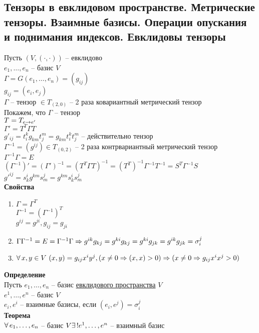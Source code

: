 \documentclass[12pt]{article}
\begin{document}
\subsection{Тензоры в евклидовом пространстве. Метрические тензоры. Взаимные базисы. Операции опускания и поднимания индексов. Евклидовы тензоры}
Пусть $(V, (\cdot, \cdot))$ -- евклидово\\
$e_1, \ldots, e_n$ -- базис $V$\\
$\Gamma = G(e_1, \ldots, e_n) = (g_{ij})$\\
$g_{ij} = (e_i, e_j)$\\
$\Gamma$ -- тензор $\in T_{(2,0)}$ -- 2 раза ковариантный метрический тензор\\
Покажем, что $\Gamma$ -- тензор\\
$T = T_{e\rightarrow e'}$\\
$\Gamma' = T^T \Gamma T$\\
$g'_{ij} = t^k_i g_{km} t^m_j = g_{km} t^k_i t^m_j$ -- действительно тензор\\
$\Gamma^{-1} = (g^{ij}) \in T_{(0,2)}$ -- 2 раза контрвариантный метрический тензор\\
$\Gamma^{-1} \Gamma = E$\\
$(\Gamma^{-1})' = (\Gamma')^{-1} = (T^T \Gamma T)^{-1} = (T^T)^{-1} \Gamma^{-1} T^{-1} = S^T \Gamma^{-1} S$\\
$g'^{ij} = s^i_k g^{km} s^j_m = g^{km}s^i_ks^j_m$\\
\textbf{Свойства}
\begin{enumerate}
    \item $\Gamma = \Gamma^T$\\
    $\Gamma^{-1} = (\Gamma^{-1})^T$\\
    $g^{ij} = g^{ji}, g_{ij} = g_{ji}$
    \item $\Gamma\Gamma^{-1} = E = \Gamma^{-1}\Gamma \Rightarrow g^{ik}g_{kj} = g^{ki}g_{kj} = g^{ki}g_{jk} = g^{ik}g_{jk} = \sigma_i^j$
    \item $\forall\, x, y \in V\ (x,y) = g_{ij} x^i y^j, (x\neq 0 \Rightarrow (x,x)> 0) \Rightarrow (x \neq 0 \Rightarrow g_{ij}x^ix^j > 0)$
\end{enumerate}
\textbf{Определение}\\
Пусть $e_1, \ldots, e_n $ -- базис \ul{евклидового пространства} $V$\\
$e^1, \ldots, e^n$ -- базис $V$\\
$e_i, e^i$ -- взаимные базисы, если $(e_i, e^j) = \sigma_i^j$\\
\textbf{Теорема}\\
$\forall\, e_1, \ldots, e_n$ -- базис $V \exists\,! e^1, \ldots, e^n$ -- взаимный базис\\
\end{document}
